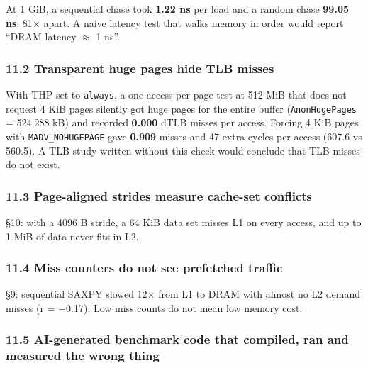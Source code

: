 \documentclass[10pt,letterpaper]{article}
\begin{document}
At 1 GiB, a sequential chase took \textbf{1.22 ns} per load
and a random chase \textbf{99.05 ns}: 81$\times$ apart. A naive
latency test that walks memory in order would report ``DRAM
latency $\approx$ 1 ns''.

\hypertarget{transparent-huge-pages-hide-tlb-misses}{%
\subsubsection{11.2 Transparent huge pages hide TLB
misses}\label{transparent-huge-pages-hide-tlb-misses}}

With THP set to \texttt{always}, a one-access-per-page test
at 512 MiB that does not request 4 KiB pages silently got
huge pages for the entire buffer (\texttt{AnonHugePages} =
524,288 kB) and recorded \textbf{0.000} dTLB misses per
access. Forcing 4 KiB pages with \texttt{MADV\_NOHUGEPAGE}
gave \textbf{0.909} misses and 47 extra cycles per access
(607.6 vs 560.5). A TLB study written without this check
would conclude that TLB misses do not exist.

\hypertarget{page-aligned-strides-measure-cache-set-conflicts}{%
\subsubsection{11.3 Page-aligned strides measure cache-set
conflicts}\label{page-aligned-strides-measure-cache-set-conflicts}}

§10: with a 4096 B stride, a 64 KiB data set misses L1 on
every access, and up to 1 MiB of data never fits in L2.

\hypertarget{miss-counters-do-not-see-prefetched-traffic}{%
\subsubsection{11.4 Miss counters do not see prefetched
traffic}\label{miss-counters-do-not-see-prefetched-traffic}}

§9: sequential SAXPY slowed 12$\times$ from L1 to DRAM with almost
no L2 demand misses (r = $-$0.17). Low miss counts do not mean
low memory cost.

\hypertarget{ai-generated-benchmark-code-that-compiled-ran-and-measured-the-wrong-thing}{%
\subsubsection{11.5 AI-generated benchmark code that
compiled, ran and measured the wrong
thing}\label{ai-generated-benchmark-code-that-compiled-ran-and-measured-the-wrong-thing}}
\end{document}
